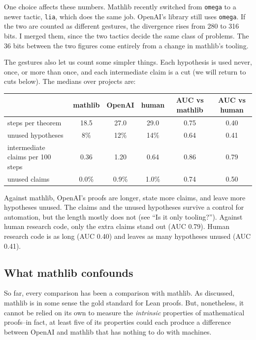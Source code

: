 \documentclass{article}
\begin{document}
One choice affects these numbers. Mathlib recently switched from \texttt{omega} to a newer tactic, \texttt{lia},
which does the same job. OpenAI's library still uses \texttt{omega}. If the two are counted as different gestures, the
divergence rises from 280 to 316 bits. I merged them, since the two tactics decide the same class of problems. The 36
bits between the two figures come entirely from a change in mathlib's tooling.

The gestures also let us count some simpler things. Each hypothesis is used never, once, or more than once, and each
intermediate claim is a cut (we will return to cuts below). The medians over projects are:
\begin{center}
\begin{tabular}{lccccc}
 & mathlib & OpenAI & human & AUC vs mathlib & AUC vs human \\
\hline
steps per theorem & 18.5 & 27.0 & 29.0 & 0.75 & 0.40 \\
unused hypotheses & 8\% & 12\% & 14\% & 0.64 & 0.41 \\
intermediate claims per 100 steps & 0.36 & 1.20 & 0.64 & 0.86 & 0.79 \\
unused claims & 0.0\% & 0.9\% & 1.0\% & 0.74 & 0.50 \\
\end{tabular}
\end{center}
Against mathlib, OpenAI's proofs are longer, state more claims, and leave more hypotheses unused. The claims and the
unused hypotheses survive a control for automation, but the length mostly does not (see ``Is it only tooling?''). Against human research
code, only the extra claims stand out (AUC 0.79). Human research code is as long (AUC 0.40) and leaves as many
hypotheses unused (AUC 0.41).

\subsection{What mathlib confounds}

So far, every comparison has been a comparison with mathlib. As discussed, mathlib is in some sense the gold standard
for Lean proofs. But, nonetheless, it cannot be relied on its own to measure the \textit{intrinsic} properties of mathematical
proofs--in fact, at least five of its properties could each produce a difference between OpenAI and mathlib that has nothing to
do with machines.
\end{document}

